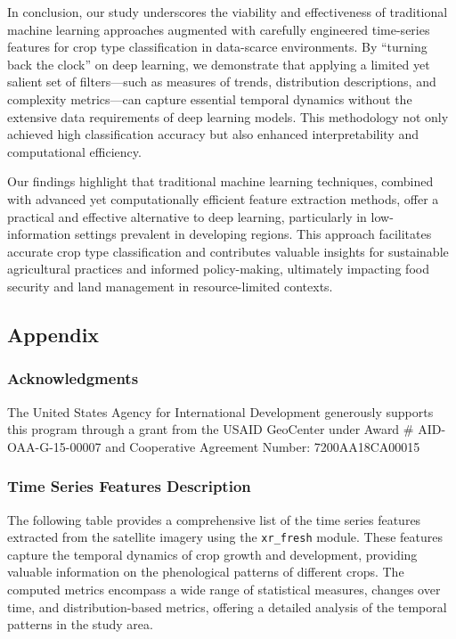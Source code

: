 \documentclass[
  journal,
  twocolumn]{IEEEtran}
\begin{document}
In conclusion, our study underscores the viability and effectiveness of
traditional machine learning approaches augmented with carefully
engineered time-series features for crop type classification in
data-scarce environments. By ``turning back the clock'' on deep
learning, we demonstrate that applying a limited yet salient set of
filters---such as measures of trends, distribution descriptions, and
complexity metrics---can capture essential temporal dynamics without the
extensive data requirements of deep learning models. This methodology
not only achieved high classification accuracy but also enhanced
interpretability and computational efficiency.

Our findings highlight that traditional machine learning techniques,
combined with advanced yet computationally efficient feature extraction
methods, offer a practical and effective alternative to deep learning,
particularly in low-information settings prevalent in developing
regions. This approach facilitates accurate crop type classification and
contributes valuable insights for sustainable agricultural practices and
informed policy-making, ultimately impacting food security and land
management in resource-limited contexts.

\newpage

\hypertarget{appendix}{%
\subsection{Appendix}\label{appendix}}

\hypertarget{acknowledgments}{%
\subsubsection{Acknowledgments}\label{acknowledgments}}

The United States Agency for International Development generously
supports this program through a grant from the USAID GeoCenter under
Award \# AID-OAA-G-15-00007 and Cooperative Agreement Number:
7200AA18CA00015

\hypertarget{time-series-features-description}{%
\subsubsection{Time Series Features
Description}\label{time-series-features-description}}

The following table provides a comprehensive list of the time series
features extracted from the satellite imagery using the
\texttt{xr\_fresh} module. These features capture the temporal dynamics
of crop growth and development, providing valuable information on the
phenological patterns of different crops. The computed metrics encompass
a wide range of statistical measures, changes over time, and
distribution-based metrics, offering a detailed analysis of the temporal
patterns in the study area.
\end{document}
